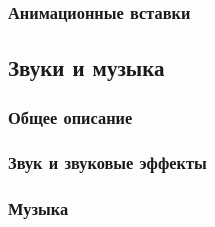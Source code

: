 \documentclass{article}
\begin{document}
\subsubsection{Анимационные вставки}

\subsection{Звуки и музыка}

\subsubsection{Общее описание}

\subsubsection{Звук и звуковые эффекты}

\subsubsection{Музыка}
\end{document}
